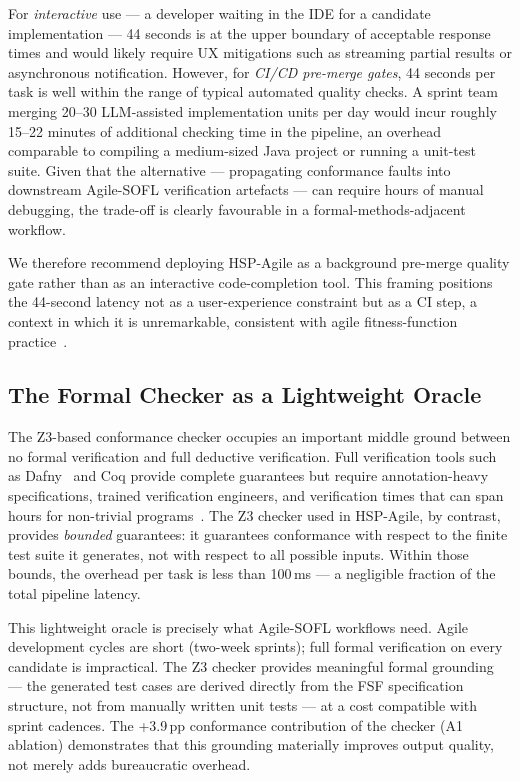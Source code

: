 For \emph{interactive} use — a developer waiting in the IDE for a candidate implementation
— 44 seconds is at the upper boundary of acceptable response times and would likely
require UX mitigations such as streaming partial results or asynchronous notification.
However, for \emph{CI/CD pre-merge gates}, 44 seconds per task is well within the range
of typical automated quality checks.  A sprint team merging 20--30 LLM-assisted
implementation units per day would incur roughly 15--22 minutes of additional checking
time in the pipeline, an overhead comparable to compiling a medium-sized Java project or
running a unit-test suite.  Given that the alternative — propagating conformance faults
into downstream Agile-SOFL verification artefacts — can require hours of manual
debugging, the trade-off is clearly favourable in a formal-methods-adjacent workflow.

We therefore recommend deploying HSP-Agile as a background pre-merge quality gate rather
than as an interactive code-completion tool.  This framing positions the 44-second latency
not as a user-experience constraint but as a CI step, a context in which it is unremarkable,
consistent with agile fitness-function practice~\citep{harman2012formalagile,beck2001xp}.

\subsection{The Formal Checker as a Lightweight Oracle}

The Z3-based conformance checker occupies an important middle ground between no formal
verification and full deductive verification.  Full verification tools such as Dafny~\citep{leino2010dafny} and Coq provide complete guarantees but require annotation-heavy specifications, trained
verification engineers, and verification times that can span hours for non-trivial
programs~\citep{woodcock2009formalsurvey}.  The Z3 checker used in HSP-Agile, by contrast, provides \emph{bounded}
guarantees: it guarantees conformance with respect to the finite test suite it generates,
not with respect to all possible inputs.  Within those bounds, the overhead per task is
less than 100\,ms — a negligible fraction of the total pipeline latency.

This lightweight oracle is precisely what Agile-SOFL workflows need.  Agile development
cycles are short (two-week sprints); full formal verification on every candidate is
impractical.  The Z3 checker provides meaningful formal grounding — the generated test
cases are derived directly from the FSF specification structure, not from manually written
unit tests — at a cost compatible with sprint cadences.  The +3.9\,pp conformance
contribution of the checker (A1 ablation) demonstrates that this grounding materially
improves output quality, not merely adds bureaucratic overhead.

